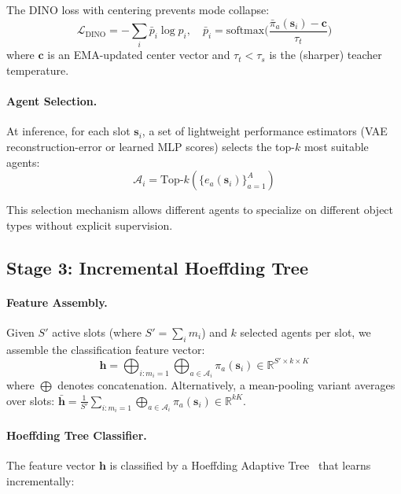 \documentclass{article}
\newcommand{\R}{\mathbb{R}}
\newcommand{\calL}{\mathcal{L}}
\newcommand{\calA}{\mathcal{A}}
\begin{document}
The DINO loss with centering prevents mode collapse:
\begin{equation}
    \calL_\text{DINO} = -\sum_{i} \bar{p}_i \log p_i, \quad
    \bar{p}_i = \text{softmax}\!\Big(\frac{\bar{\pi}_a(\mathbf{s}_i) - \mathbf{c}}{\tau_t}\Big)
    \label{eq:dino}
\end{equation}
where $\mathbf{c}$ is an EMA-updated center vector and $\tau_t < \tau_s$ is the (sharper) teacher temperature.

\paragraph{Agent Selection.}
At inference, for each slot $\mathbf{s}_i$, a set of lightweight performance estimators (VAE reconstruction-error or learned MLP scores) selects the top-$k$ most suitable agents:
\begin{equation}
    \calA_i = \text{Top-}k\!\left(\{e_a(\mathbf{s}_i)\}_{a=1}^{A}\right)
\end{equation}

This selection mechanism allows different agents to specialize on different object types without explicit supervision.


\subsection{Stage 3: Incremental Hoeffding Tree}
\label{sec:tree}

\paragraph{Feature Assembly.}
Given $S'$ active slots (where $S' = \sum_i m_i$) and $k$ selected agents per slot, we assemble the classification feature vector:
\begin{equation}
    \mathbf{h} = \bigoplus_{i: m_i=1} \bigoplus_{a \in \calA_i} \pi_a(\mathbf{s}_i) \in \R^{S' \times k \times K}
    \label{eq:hidden}
\end{equation}
where $\bigoplus$ denotes concatenation. Alternatively, a mean-pooling variant averages over slots: $\bar{\mathbf{h}} = \frac{1}{S'}\sum_{i:m_i=1} \bigoplus_{a \in \calA_i} \pi_a(\mathbf{s}_i) \in \R^{kK}$.

\paragraph{Hoeffding Tree Classifier.}
The feature vector $\mathbf{h}$ is classified by a Hoeffding Adaptive Tree~\citep{bifet2009adaptive} that learns incrementally:
\end{document}
